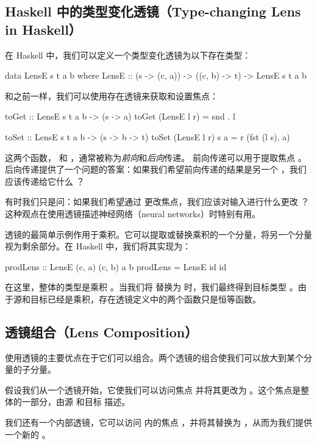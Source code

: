\documentclass[DaoFP]{subfiles}
\begin{document}
 \subsection{Haskell 中的类型变化透镜（Type-changing Lens in Haskell）}

 在 Haskell 中，我们可以定义一个类型变化透镜为以下存在类型：
 \begin{haskell}
  data LensE s t a b where
  LensE :: (s -> (c, a)) -> ((c, b) -> t) -> LensE s t a b
 \end{haskell}

 和之前一样，我们可以使用存在透镜来获取和设置焦点：
 \begin{haskell}
  toGet :: LensE s t a b -> (s -> a)
  toGet (LensE l r) = snd . l

  toSet :: LensE s t a b -> (s -> b -> t)
  toSet (LensE l r) s a = r (fst (l s), a)
 \end{haskell}

 这两个函数， 和 ，通常被称为\emph{前向}和\emph{后向}传递。
 前向传递可以用于提取焦点 。后向传递提供了一个问题的答案：如果我们希望前向传递的结果是另一个 ，我们应该传递给它什么 ？

 有时我们只是问：如果我们希望通过  更改焦点，我们应该对输入进行什么更改 ？这种观点在使用透镜描述神经网络（neural networks）时特别有用。

 透镜的最简单示例作用于乘积。它可以提取或替换乘积的一个分量，将另一个分量视为剩余部分。在 Haskell 中，我们将其实现为：
 \begin{haskell}
  prodLens :: LensE (c, a) (c, b) a b
  prodLens = LensE id id
 \end{haskell}
 在这里，整体的类型是乘积 。当我们将  替换为  时，我们最终得到目标类型 。由于源和目标已经是乘积，存在透镜定义中的两个函数只是恒等函数。

 \subsection{透镜组合（Lens Composition）}

 使用透镜的主要优点在于它们可以组合。两个透镜的组合使我们可以放大到某个分量的子分量。

 假设我们从一个透镜开始，它使我们可以访问焦点  并将其更改为 。这个焦点是整体的一部分，由源  和目标  描述。

 我们还有一个内部透镜，它可以访问  内的焦点 ，并将其替换为 ，从而为我们提供一个新的 。
\end{document}

